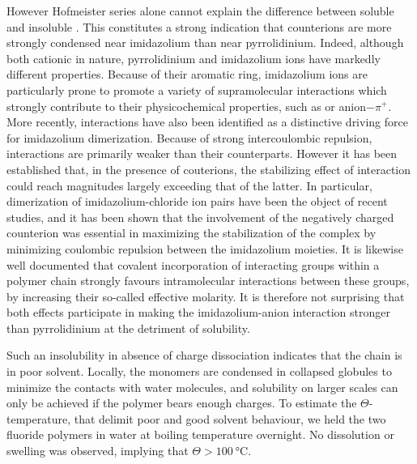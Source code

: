\documentclass[journal=jacsat,manuscript=article]{achemso}
\begin{document}
However Hofmeister series alone cannot explain the difference between soluble  and insoluble . This constitutes a strong indication that counterions are more strongly condensed near imidazolium than near pyrrolidinium. Indeed, although both cationic in nature, pyrrolidinium and imidazolium ions have markedly different properties. Because of their aromatic ring, imidazolium ions are particularly prone to promote a variety of supramolecular interactions which strongly contribute to their physicochemical properties, such as \ce{\pi+-\pi} or anion$-\pi^+$.  More recently, \ce{\pi+-\pi+} interactions have also been identified as a distinctive driving force for imidazolium dimerization\cite{Geronimo2011}. Because of strong intercoulombic repulsion, \ce{\pi+-\pi+} interactions are primarily weaker than their \ce{\pi-\pi} counterparts. However it has been established that, in the presence of couterions, the stabilizing effect of \ce{\pi+-\pi+} interaction could reach magnitudes largely exceeding that of the latter\cite{Geronimo2011}. In particular, dimerization of imidazolium-chloride ion pairs have been the object of recent studies, and it has been shown that the involvement of the negatively charged counterion was essential in maximizing the stabilization of the \ce{\pi+-\pi+} complex by minimizing coulombic repulsion between the imidazolium moieties\cite{Matthews2014,Gao2015a}. It is likewise well documented that covalent incorporation of interacting groups within a polymer chain strongly favours intramolecular interactions between these groups, by increasing their so-called effective molarity\cite{Li2003,Mulder2004,Huerta2013}. It is therefore not surprising that both effects participate in making the imidazolium-anion interaction stronger than pyrrolidinium at the detriment of solubility.

Such an insolubility in absence of charge dissociation indicates that the chain is in poor solvent. Locally, the monomers are condensed in collapsed globules to minimize the contacts with water molecules, and solubility on larger scales can only be achieved if the polymer bears enough charges\cite{Khokhlov1980,Raphael1990}. To estimate the $\Theta$-temperature, that delimit poor and good solvent behaviour, we held the two fluoride polymers in water at boiling temperature overnight. No dissolution or swelling was observed, implying that $\Theta>\SI{100}{\celsius}$. %
\end{document}
